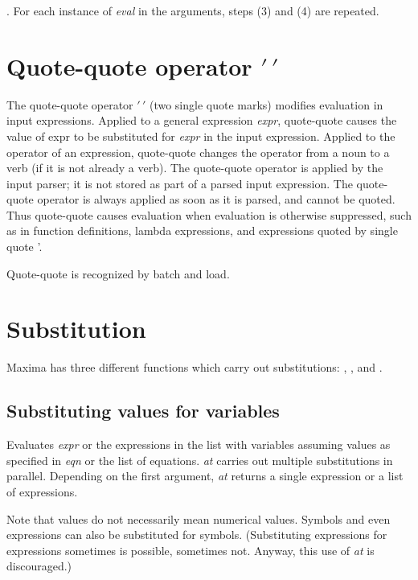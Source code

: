 \documentclass[../Maxima_Workbook.tex]{subfiles}
\begin{document}
. For each instance of \emph{eval} in the arguments, steps (3) and (4) are repeated.

\section{Quote-quote operator $ ' \,' $}

\lz {} \hfill {}

\lz The quote-quote operator $ '\, ' $ (two single quote marks) modifies evaluation in input
expressions. Applied to a general expression \emph{expr}, quote-quote causes the value of expr to be substituted for \emph{expr} in the input expression. Applied to the operator of an expression, quote-quote changes the operator from a noun to a verb (if it is not already a verb). The quote-quote operator is applied by the input parser; it is not stored as part of a parsed input expression. The quote-quote operator is always applied as soon as it is parsed, and cannot be quoted. Thus quote-quote causes evaluation when evaluation is otherwise suppressed, such as in function definitions, lambda expressions, and expressions quoted by single quote '. 

\lz Quote-quote is recognized by batch and load.

\section{Substitution}

Maxima has three different functions which carry out substitutions: , , and .

\subsection{Substituting values for variables}

\lz {} \hfill \tcr{[function]}

\lz Evaluates \emph{expr} or the expressions in the list with variables assuming values as specified in \emph{eqn} or the list of equations. \emph{at} carries out multiple substitutions in parallel. Depending on the first argument, \emph{at} returns a single expression or a list of expressions. 

\lz Note that values do not necessarily mean numerical values. Symbols and even expressions can also be substituted for symbols. (Substituting expressions for expressions sometimes is possible, sometimes not. Anyway, this use of \emph{at} is discouraged.)
\end{document}
